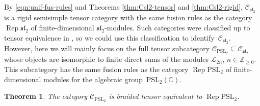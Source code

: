 \documentclass[pdftex]{sigma}
\numberwithin{equation}{section}
\newtheorem{Theorem}{Theorem}[section]
\theoremstyle{definition}
\begin{document}
By \eqref{eqn:unif-fus-rules} and Theorems \ref{thm:Csl2-tensor} and \ref{thm:Csl2-rigid}, $\mathcal{C}_{\mathfrak{sl}_2}$ is a rigid semisimple tensor category with the same fusion rules as the category $\operatorname{Rep} \mathfrak{sl}_2$ of finite-dimensional $\mathfrak{sl}_2$-modules. Such categories were classified up to tensor equivalence in \cite{KaWe}, so we could use this classification to identify~$\mathcal{C}_{\mathfrak{sl}_2}$.
However, here we will mainly focus on the full tensor subcategory $\mathcal{C}_{\mathrm{PSL}_2}\subseteq\mathcal{C}_{\mathfrak{sl}_2}$ whose objects are isomorphic to finite direct sums of the modules $\mathcal{L}_{2n}$, $n\in\mathbb{Z}_{\geq 0}$. This subcategory has the same fusion rules as the category $\operatorname{Rep} \mathrm{PSL}_2$ of finite-dimensional modules for the algebraic group~$\mathrm{PSL}_2(\mathbb{C})$.
\begin{Theorem}\label{thm:braid-equiv}
The category $\mathcal{C}_{\mathrm{PSL}_2}$ is braided tensor equivalent to $\operatorname{Rep} \mathrm{PSL}_2$.
\end{Theorem}
\end{document}
